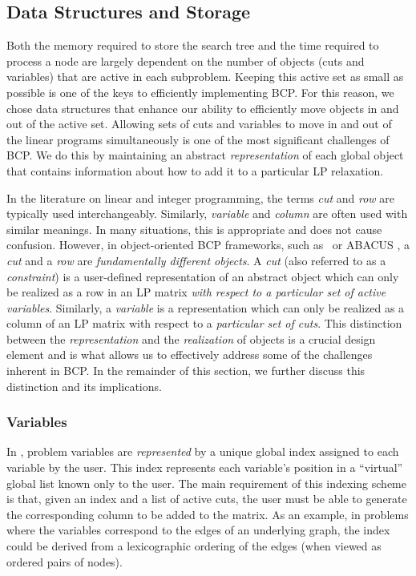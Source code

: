 \subsection{Data Structures and Storage}
\label{data-structures}

Both the memory required to store the search tree and the time
required to process a node are largely dependent on the number of
objects (cuts and variables) that are active in each subproblem.
Keeping this active set as small as possible is one of the keys to
efficiently implementing BCP. For this reason, we chose data
structures that enhance our ability to efficiently move objects in and
out of the active set. Allowing sets of cuts and variables to move in
and out of the linear programs simultaneously is one of the most
significant challenges of BCP. We do this by maintaining an abstract
{\em representation} of each global object that contains information
about how to add it to a particular LP relaxation. 

In the literature on linear and integer programming, the terms {\em
cut} and {\em row} are typically used interchangeably. Similarly, {\em
variable} and {\em column} are often used with similar meanings. In
many situations, this is appropriate and does not cause confusion.
However, in object-oriented BCP frameworks, such as \BB\ or ABACUS
\cite{abacus,abacus1}, a {\em cut} and a {\em row} are {\em fundamentally
different objects}. A {\em cut} (also referred to as a {\em
constraint}) is a user-defined representation of an abstract object
which can only be realized as a row in an LP matrix {\em with respect
to a particular set of active variables}. Similarly, a {\em variable}
is a representation which can only be realized as a column of an LP
matrix with respect to a {\em particular set of cuts}. This
distinction between the {\em representation} and the {\em realization}
of objects is a crucial design element and is what allows us to
effectively address some of the challenges inherent in BCP. In the
remainder of this section, we further discuss this distinction
and its implications.


\subsubsection{Variables}
\label{variables}

In \BB, problem variables are {\em represented} by a unique global
index assigned to each variable by the user. This index represents
each variable's position in a ``virtual'' global list known only to
the user. The main requirement of this indexing scheme is that, given
an index and a list of active cuts, the user must be able to generate
the corresponding column to be added to the matrix. As an example, in
problems where the variables correspond to the edges of an underlying
graph, the index could be derived from a lexicographic ordering of the
edges (when viewed as ordered pairs of nodes).

